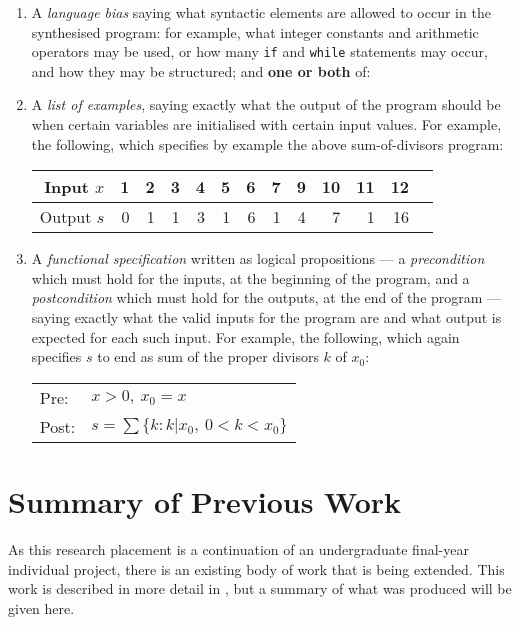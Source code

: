 \documentclass[a4paper,twoside,notitlepage,12pt]{article}
\begin{document}
\begin{enumerate}
    \item A \emph{language bias} saying what syntactic elements are allowed to occur in 
    the synthesised program: for example, what integer constants and arithmetic 
    operators may be used, or how many \verb|if| and \verb|while| statements may 
    occur, and how they may be structured; and \textbf{one or both} of:

    \item A \emph{list of examples}, saying exactly what the output of the program 
    should be when certain variables are initialised with certain input values. For 
    example, the following, which specifies by example the above 
    sum-of-divisors program:
    
    \begin{tabular}{| r || r | r | r | r | r | r | r | r | r | r | r | r |}
        \hline
        Input $x$  & 1 & 2 & 3 & 4 & 5 & 6 & 7 & 9 & 10 & 11 & 12 \\
        \hline
        Output $s$ & 0 & 1 & 1 & 3 & 1 & 6 & 1 & 4 &  7 &  1 & 16 \\
        \hline
    \end{tabular}

    \item A \emph{functional specification} written as logical propositions --- a 
    \emph{precondition} which must hold for the inputs, at the beginning of the 
    program, and a \emph{postcondition} which must hold for the outputs, at the end of 
    the program --- saying exactly what the valid inputs for the program are and 
    what output is expected for each such input. For example, the following, which 
    again specifies $s$ to end as sum of the proper divisors $k$ of $x_0$:
    
    \begin{tabular}{|ll|}
        \hline
        Pre:  & $x > 0,\ x_0 = x$ \\
        Post: & $s = \sum\{k : k|x_0,\ 0<k<x_0\}$ \\
        \hline
    \end{tabular}
    
\end{enumerate}

\clearpage
\section{Summary of Previous Work} \label{sec:prv}

As this research placement is a continuation of an undergraduate final-year individual 
project, there is an existing body of work that is being extended. This work is 
described in more detail in \cite{final}, but a summary of what was produced will be 
given here.
\end{document}

